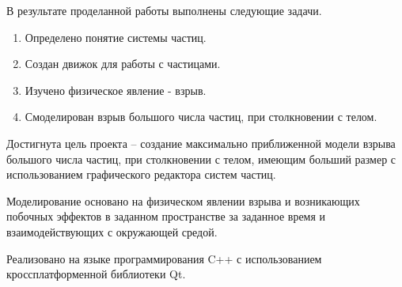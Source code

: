 \Conclusion %

\hfill

В результате проделанной работы выполнены следующие задачи. 
\begin{enumerate}
	\item Определено понятие системы частиц. 
	\item Создан движок для работы с частицами. 
	\item Изучено физическое явление - взрыв. 
	\item Смоделирован взрыв большого числа частиц, при столкновении с телом. 
\end{enumerate}

Достигнута цель проекта -- создание максимально приближенной модели взрыва большого числа частиц, при столкновении с телом, имеющим больший размер с использованием графического редактора систем частиц. 

Моделирование основано на физическом явлении взрыва и возникающих побочных эффектов в заданном пространстве за заданное время и взаимодействующих с окружающей средой. 

Реализовано на языке программирования C++ с использованием кроссплатформенной библиотеки Qt. 